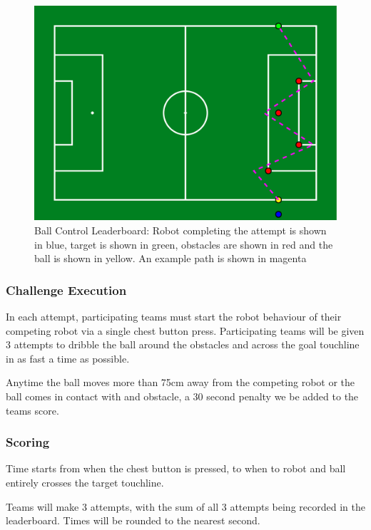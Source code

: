 \begin{figure}[t]
    \centerline{\includegraphics[width=\columnwidth]{figs/control_leaderboard.pdf}}
    \caption{Ball Control Leaderboard: Robot completing the attempt is shown in blue, target is shown in green, obstacles are shown in red and the ball is shown in yellow. An example path is shown in magenta}
    \label{fig:ball_control_leaderboard}
\end{figure}

\subsubsection{Challenge Execution}
In each attempt, participating teams must start the robot behaviour of their competing robot via a single chest button
press. Participating teams will be given 3 attempts to dribble the ball around the obstacles and across
the goal touchline in as fast a time as possible.

Anytime the ball moves more than 75cm away from the competing robot or the ball comes in contact with
and obstacle, a 30 second penalty we be added to the teams score.

\subsubsection{Scoring}
Time starts from when the chest button is pressed, to when to robot and ball entirely crosses the target touchline.

Teams will make 3 attempts, with the sum of all 3 attempts being recorded in the leaderboard.
Times will be rounded to the nearest second.

